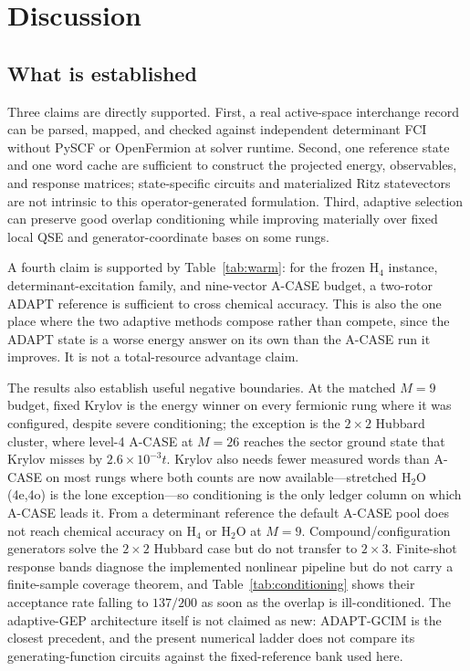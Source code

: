 \documentclass[aps,pra,reprint,superscriptaddress,nofootinbib,floatfix]{revtex4-2}
\begin{document}
\section{Discussion}
\label{sec:discussion}

\subsection{What is established}
\label{sec:established}

Three claims are directly supported.  First, a real active-space interchange
record can be parsed, mapped, and checked against independent determinant FCI
without PySCF or OpenFermion at solver runtime.  Second, one reference state
and one word cache are sufficient to construct the projected energy,
observables, and response matrices; state-specific circuits and materialized
Ritz statevectors are not intrinsic to this operator-generated formulation.
Third, adaptive selection can preserve good overlap conditioning while
improving materially over fixed local QSE and generator-coordinate bases on
some rungs.

A fourth claim is supported by Table~\ref{tab:warm}: for the frozen H$_4$
instance, determinant-excitation family, and nine-vector A-CASE budget, a
two-rotor ADAPT reference is sufficient to cross chemical accuracy.  This is
also the one place where the two adaptive methods compose rather than compete,
since the ADAPT state is a worse energy answer on its own than the A-CASE run
it improves.  It is not a total-resource advantage claim.

The results also establish useful negative boundaries.  At the matched $M=9$
budget, fixed Krylov is the energy winner on every fermionic rung where it was
configured, despite severe conditioning; the exception is the $2\times2$
Hubbard cluster, where level-4 A-CASE at $M=26$ reaches the sector ground state
that Krylov misses by $2.6\times10^{-3}t$.  Krylov also needs fewer measured
words than A-CASE on most rungs where both counts are now available---stretched
H$_2$O (4e,4o) is the lone exception---so conditioning is the only ledger
column on which A-CASE leads it.  From a
determinant reference the default A-CASE pool does not reach chemical accuracy
on H$_4$ or H$_2$O at $M=9$.  Compound/configuration generators solve the
$2\times2$ Hubbard case but do not transfer to $2\times3$.  Finite-shot
response bands diagnose the implemented nonlinear pipeline but do not carry a
finite-sample coverage theorem, and Table~\ref{tab:conditioning} shows their
acceptance rate falling to $137/200$ as soon as the overlap is ill-conditioned.
The adaptive-GEP architecture itself is not claimed as new: ADAPT-GCIM is the
closest precedent, and the present numerical ladder does not compare its
generating-function circuits against the fixed-reference bank used here.
\end{document}
